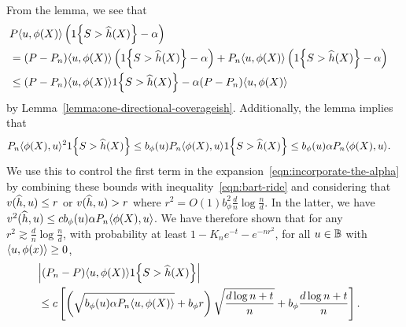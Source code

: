 \documentclass[11pt]{article}
\newcommand{\radphi}{b_{\phi}}
\newcommand{\scorerv}{S}
\begin{document}
From the lemma, we see that
\begin{align}
  \lefteqn{
    P \<u, \phi(X)\> \left(\indic{\scorerv > \what{h}(X)}
    - \alpha\right)} \nonumber \\
  & = (P - P_n)\<u, \phi(X)\> \left(\indic{\scorerv > \what{h}(X)}
  - \alpha\right)
  + P_n \<u, \phi(X)\> \left(\indic{\scorerv > \what{h}(X)}
  - \alpha\right) \nonumber \\
  & \le (P - P_n) \<u, \phi(X)\> \indic{\scorerv > \what{h}(X)}
  - \alpha (P - P_n) \<u, \phi(X)\>
  \label{eqn:incorporate-the-alpha}
\end{align}
by Lemma~\ref{lemma:one-directional-coverageish}.
%
Additionally, the lemma implies that
\begin{align*}
  P_n\<\phi(X), u\>^2 \indic{\scorerv > \what{h}(X)}
  & \le \radphi(u) P_n \<\phi(X), u\> \indic{\scorerv > \what{h}(X)}
  \le \radphi(u) \alpha P_n \<\phi(X), u\>.
\end{align*}
We use this to control the first term in the
expansion~\eqref{eqn:incorporate-the-alpha}
by combining these bounds with inequality~\eqref{eqn:bart-ride}
and considering
that $v(\widehat{h}, u) \le r$ or $v(\widehat{h}, u) > r$
where $r^2 = O(1) \radphi^2 \frac{d}{n} \log \frac{n}{d}$.
%
In the latter, we have
$v^2(\what{h}, u) \le c \radphi(u) \alpha P_n\<\phi(X), u\>$.
%
We have therefore shown that for
any $r^2 \gtrsim \frac{d}{n} \log \frac{n}{d}$,
with probability at
least $1 - K_n e^{-t} - e^{-n r^2}$,
for all $u \in \mathbb{B}$
with $\langle u, \phi(x)\rangle \ge 0$,
\begin{align}
  \label{eqn:ashby-stop}
  \lefteqn{\left|(P_n - P)\<u, \phi(X)\> \indic{\scorerv > \what{h}(X)}
    \right|}
  \\
  & \le c \left[
    \left(\sqrt{\radphi(u) \alpha P_n \<u, \phi(X)\>} + \radphi r\right)
    \sqrt{\frac{d \log n + t}{n}}
    + \radphi \frac{d \log n + t}{n}
    \right].
  \nonumber
\end{align}
\end{document}
